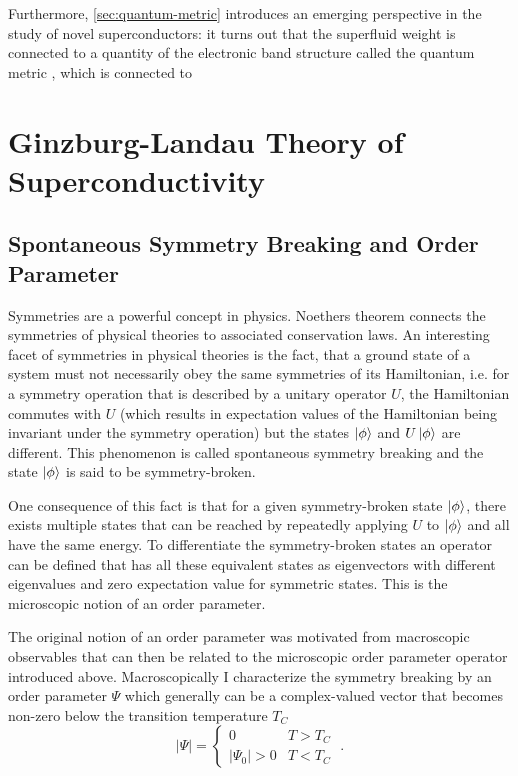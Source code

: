 \documentclass[../notes.tex]{subfiles}
\begin{document}
Furthermore, \cref{sec:quantum-metric} introduces an emerging perspective in the study of novel superconductors: it turns out that the superfluid weight is connected to a quantity of the electronic band structure called the quantum metric \cite{peottaSuperfluidityTopologicallyNontrivial2015, yuQuantumGeometryQuantum2024}, which is connected to 

\section{Ginzburg-Landau Theory of Superconductivity}\label{sec:Ginzburg-Landau theory of superconductivity}

\subsection*{Spontaneous Symmetry Breaking and Order Parameter}

Symmetries are a powerful concept in physics.
Noethers theorem \cite{noetherInvarianteVariationsprobleme1918} connects the symmetries of physical theories to associated conservation laws.
An interesting facet of symmetries in physical theories is the fact, that a ground state of a system must not necessarily obey the same symmetries of its Hamiltonian, i.e. for a symmetry operation that is described by a unitary operator \(U\), the Hamiltonian commutes with \(U\) (which results in expectation values of the Hamiltonian being invariant under the symmetry operation) but the states \(\ket{\phi}\) and \(U \ket{\phi}\) are different.
This phenomenon is called spontaneous symmetry breaking and the state \(\ket{\phi}\) is said to be symmetry-broken.

One consequence of this fact is that for a given symmetry-broken state \(\ket{\phi}\), there exists multiple states that can be reached by repeatedly applying \(U\) to \(\ket{\phi}\) and all have the same energy.
To differentiate the symmetry-broken states an operator can be defined that has all these equivalent states as eigenvectors with different eigenvalues and zero expectation value for symmetric states.
This is the microscopic notion of an order parameter.

The original notion of an order parameter was motivated from macroscopic observables that can then be related to the microscopic order parameter operator introduced above.
Macroscopically I characterize the symmetry breaking by an order parameter \(\Psi\) which generally can be a complex-valued vector that becomes non-zero below the transition temperature \(T_C\)
\begin{equation}
	\vert \Psi \vert =
	\begin{cases}
		0 & T > T_C \\
		\vert \Psi_0 \vert > 0 & T < T_C
	\end{cases} \;.
\end{equation}
\end{document}
